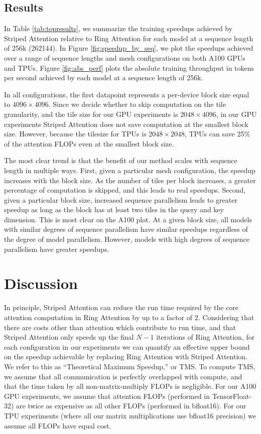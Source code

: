 \subsection{Results}\label{sec:results}

In Table \ref{tab:topresults}, we summarize the training speedups achieved by Striped Attention relative to Ring Attention for each model at a sequence length of 256k (262144). In Figure \ref{fig:speedup_by_seq}, we plot the speedups achieved over a range of sequence lengths and mesh configurations on both A100 GPUs and TPUs. Figure \ref{fig:abs_perf} plots the absolute training throughput in tokens per second achieved by each model at a sequence length of 256k.

In all configurations, the first datapoint represents a per-device block size equal to $4096 \times 4096$. Since we decide whether to skip computation on the tile granularity, and the tile size for our GPU experiments is $2048 \times 4096$, in our GPU experiments Striped Attention does not save computation at the smallest block size. However, because the tilesize for TPUs is $2048 \times 2048$, TPUs can save 25\% of the attention FLOPs even at the smallest block size.

The most clear trend is that the benefit of our method scales with sequence length in multiple ways. First, given a particular mesh configuration, the speedup increases with the block size. As the number of tiles per block increases, a greater percentage of computation is skipped, and this leads to real speedups. Second, given a particular block size, increased sequence parallelism leads to greater speedup as long as the block has at least two tiles in the query and key dimension. This is most clear on the A100 plot. At a given block size, all models with similar degrees of sequence parallelism have similar speedups regardless of the degree of model parallelism. However, models with high degrees of sequence parallelism have greater speedups.

\section{Discussion}

In principle, Striped Attention can reduce the run time required by the core attention computation in Ring Attention by up to a factor of $2$. Considering that there are costs other than attention which contribute to run time, and that Striped Attention only speeds up the final $N - 1$ iterations of Ring Attention, for each configuration in our experiments we can quantify an effective upper bound on the speedup achievable by replacing Ring Attention with Striped Attention. We refer to this as ``Theoretical Maximum Speedup,'' or TMS. To compute TMS, we assume that all communication is perfectly overlapped with compute, and that the time taken by all non-matrix-multiply FLOPs is negligible. For our A100 GPU experiments, we assume that attention FLOPs (performed in TensorFloat-32) are twice as expensive as all other FLOPs (performed in bfloat16). For our TPU experiments (where all our matrix multiplications use bfloat16 precision) we assume all FLOPs have equal cost.

